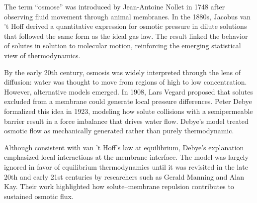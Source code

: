\begin{historical}
The term “osmose” was introduced by Jean-Antoine Nollet in 1748 after observing fluid movement through animal membranes. In the 1880s, Jacobus van 't Hoff derived a quantitative expression for osmotic pressure in dilute solutions that followed the same form as the ideal gas law. The result linked the behavior of solutes in solution to molecular motion, reinforcing the emerging statistical view of thermodynamics.

By the early 20th century, osmosis was widely interpreted through the lens of diffusion: water was thought to move from regions of high to low concentration. However, alternative models emerged. In 1908, Lars Vegard proposed that solutes excluded from a membrane could generate local pressure differences. Peter Debye formalized this idea in 1923, modeling how solute collisions with a semipermeable barrier result in a force imbalance that drives water flow. Debye's model treated osmotic flow as mechanically generated rather than purely thermodynamic.

Although consistent with van ’t Hoff’s law at equilibrium, Debye’s explanation emphasized local interactions at the membrane interface. The model was largely ignored in favor of equilibrium thermodynamics until it was revisited in the late 20th and early 21st centuries by researchers such as Gerald Manning and Alan Kay. Their work highlighted how solute–membrane repulsion contributes to sustained osmotic flux.
\end{historical}
